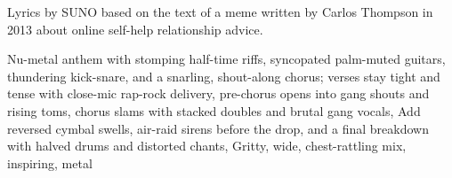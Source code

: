 
\begin{notes}
Lyrics by SUNO based on the text of a meme written by Carlos Thompson in 2013 about online self-help relationship advice.
\end{notes}
\begin{style}
Nu-metal anthem with stomping half-time riffs, syncopated palm-muted guitars, thundering kick-snare, and a snarling, shout-along chorus; verses stay tight and tense with close-mic rap-rock delivery, pre-chorus opens into gang shouts and rising toms, chorus slams with stacked doubles and brutal gang vocals, Add reversed cymbal swells, air-raid sirens before the drop, and a final breakdown with halved drums and distorted chants, Gritty, wide, chest-rattling mix, inspiring, metal
\end{style}
